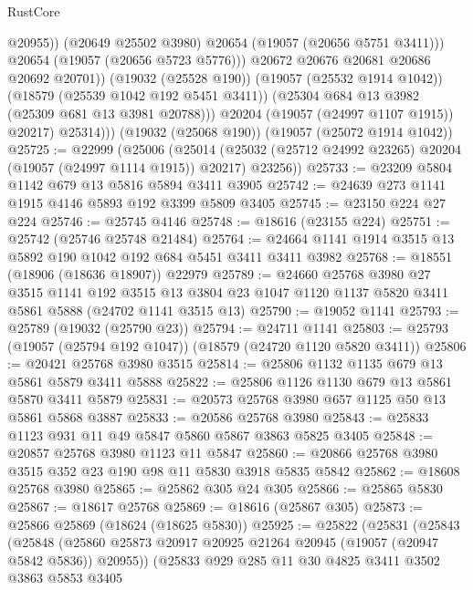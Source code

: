 \begin{lexlean}{RustCore}
\begin{coremodule}
                          @20955))
                      (@20649 @25502 @3980)
                      @20654
                      (@19057 (@20656 @5751 @3411)))
                    @20654
                    (@19057 (@20656 @5723 @5776)))
                  @20672
                  @20676
                  @20681
                  @20686
                  @20692
                  @20701))
              (@19032 (@25528 @190))
              (@19057 (@25532 @1914 @1042))
              (@18579 (@25539 @1042 @192 @5451 @3411))
              (@25304 @684 @13 @3982 (@25309 @681 @13 @3981 @20788)))
            @20204
            (@19057 (@24997 @1107 @1915))
            @20217)
          @25314)))
    (@19032 (@25068 @190))
    (@19057 (@25072 @1914 @1042))
@25725 := @22999
    (@25006
      (@25014 (@25032 (@25712 @24992 @23265) @20204 (@19057 (@24997 @1114 @1915)) @20217) @23256))
@25733 := @23209 @5804 @1142 @679 @13 @5816 @5894 @3411 @3905
@25742 := @24639 @273 @1141 @1915 @4146 @5893 @192 @3399 @5809 @3405
@25745 := @23150 @224 @27 @224
@25746 := @25745 @4146
@25748 := @18616 (@23155 @224)
@25751 := @25742 (@25746 @25748 @21484)
@25764 := @24664 @1141 @1914 @3515 @13 @5892 @190 @1042 @192 @684 @5451 @3411 @3411 @3982
@25768 := @18551 (@18906 (@18636 @18907)) @22979
@25789 := @24660
    @25768
    @3980
    @27
    @3515
    @1141
    @192
    @3515
    @13
    @3804
    @23
    @1047
    @1120
    @1137
    @5820
    @3411
    @5861
    @5888
    (@24702 @1141 @3515 @13)
@25790 := @19052 @1141
@25793 := @25789 (@19032 (@25790 @23))
@25794 := @24711 @1141
@25803 := @25793 (@19057 (@25794 @192 @1047)) (@18579 (@24720 @1120 @5820 @3411))
@25806 := @20421 @25768 @3980 @3515
@25814 := @25806 @1132 @1135 @679 @13 @5861 @5879 @3411 @5888
@25822 := @25806 @1126 @1130 @679 @13 @5861 @5870 @3411 @5879
@25831 := @20573 @25768 @3980 @657 @1125 @50 @13 @5861 @5868 @3887
@25833 := @20586 @25768 @3980
@25843 := @25833 @1123 @931 @11 @49 @5847 @5860 @5867 @3863 @5825 @3405
@25848 := @20857 @25768 @3980 @1123 @11 @5847
@25860 := @20866 @25768 @3980 @3515 @352 @23 @190 @98 @11 @5830 @3918 @5835 @5842
@25862 := @18608 @25768 @3980
@25865 := @25862 @305 @24 @305
@25866 := @25865 @5830
@25867 := @18617 @25768
@25869 := @18616 (@25867 @305)
@25873 := @25866 @25869 (@18624 (@18625 @5830))
@25925 := @25822
    (@25831
      (@25843
        (@25848 (@25860 @25873 @20917 @20925 @21264 @20945 (@19057 (@20947 @5842 @5836)) @20955))
        (@25833
          @929
          @285
          @11
          @30
          @4825
          @3411
          @3502
          @3863
          @5853
          @3405

\end{coremodule}
\end{lexlean}
